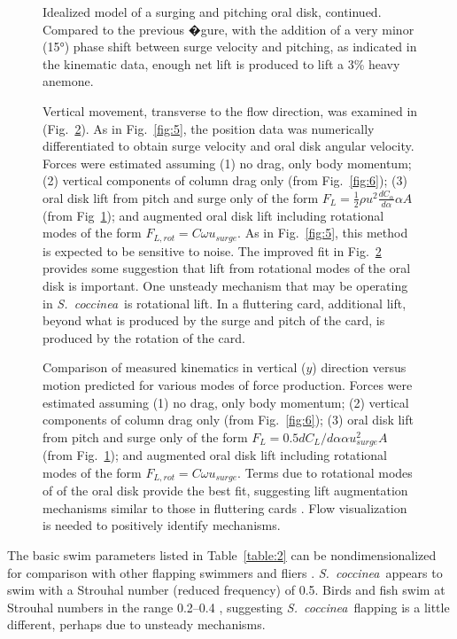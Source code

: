 \documentclass[10pt]{article}
\newcommand{\Genus}[1]{\emph{#1}}
\newcommand{\Stomphia}{\Genus{S.~coccinea}}
\begin{document}
\begin{figure}
\caption{Idealized model of a surging and pitching oral disk, continued.  Compared to the previous �gure, with the addition of a very minor (\ang{15}) phase shift between surge velocity and pitching, as indicated in the kinematic data, enough net lift is produced to lift a 3\% heavy anemone. }
\label{fig:8}
\end{figure}
\begin{figure}
	
Vertical movement, transverse to the flow direction, was examined in (Fig.~\ref{fig:9}). As in Fig.~\ref{fig:5}, the position data was numerically differentiated to obtain surge velocity and oral disk angular velocity.  Forces were estimated assuming (1) no drag, only body momentum; (2) vertical components of column drag only (from Fig.~\ref{fig:6}); (3) oral disk lift from pitch and surge only of the form $F_L = \frac{1}{2}\rho u^2 \frac{dC_\alpha}{d\alpha}\alpha  A$ (from Fig~\ref{fig:8}); and augmented oral disk lift including rotational modes of the form $F_{L,rot} = C \omega u_{surge}$. As in Fig.~\ref{fig:5}, this method is expected to be sensitive to noise.  The improved fit in Fig.~\ref{fig:9} provides some suggestion that lift from rotational modes of the oral disk is important. One unsteady mechanism that may be operating in \Stomphia\ is rotational lift.  In a fluttering card, additional lift, beyond what is produced by the surge and pitch of the card, is produced by the rotation of the card.

\caption{Comparison of measured kinematics in vertical ($y$) direction versus motion predicted for various modes of force production.  Forces were estimated assuming (1) no drag, only body momentum; (2) vertical components of column drag only (from Fig.~\ref{fig:6}); (3) oral disk lift from pitch and surge only of the form $F_L = 0.5 dC_L/d\alpha \alpha u_{surge}^2 A$ (from Fig.~\ref{fig:8}); and augmented oral disk lift including rotational modes of the form $F_{L,rot} = C\omega u_{surge}$.  Terms due to rotational modes of of the oral disk provide the best fit, suggesting lift augmentation mechanisms similar to those in fluttering cards \citep{Pesavento:2004, Andersen:2005a, Andersen:2005}.  Flow visualization is needed to positively identify  mechanisms.}
\label{fig:9}
\end{figure}
 	
The basic swim parameters listed in Table~\ref{table:2} can be nondimensionalized for comparison with other flapping swimmers and fliers \citep{Taylor:2003}.  \Stomphia\ appears to swim with a Strouhal number (reduced frequency) of \num{0.5}.  Birds and fish swim at Strouhal numbers in the range \numrange{0.2}{0.4} \citep{Taylor:2003}, suggesting \Stomphia\ flapping is a little different, perhaps due to unsteady mechanisms.
	  
\end{document}
